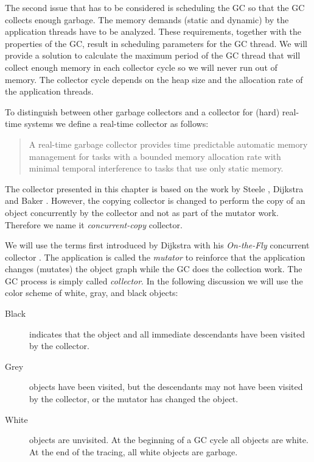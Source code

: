The second issue that has to be considered is scheduling the GC so
that the GC collects enough garbage. The memory demands (static and
dynamic) by the application threads have to be analyzed. These
requirements, together with the properties of the GC, result in
scheduling parameters for the GC thread. We will provide a solution
to calculate the maximum period of the GC thread that will collect
enough memory in each collector cycle so we will never run out of
memory. The collector cycle depends on the heap size and the
allocation rate of the application threads.

To distinguish between other garbage collectors and a collector for
(hard) real-time systems we define a real-time collector as follows:

\begin{quote}
    A real-time garbage collector provides time predictable
    automatic memory management for tasks with a bounded memory
    allocation rate with minimal temporal interference to tasks
    that use only static memory.
\end{quote}


The collector presented in this chapter is based on the work by
Steele \cite{gc:steele75},  Dijkstra \cite{gc:dijkstra78} and Baker
\cite{gc:baker78}. However, the copying collector is changed to
perform the copy of an object concurrently by the collector and not
as part of the mutator work. Therefore we name it
\emph{concurrent-copy} collector.

We will use the terms first introduced by Dijkstra with his
\emph{On-the-Fly} concurrent collector \cite{gc:dijkstra78}. The
application is called the \emph{mutator} to reinforce that the
application changes (mutates) the object graph while the GC does the
collection work. The GC process is simply called \emph{collector}. In
the following discussion we will use the color scheme of white, gray,
and black objects:

\begin{description}
    \item[Black] indicates that the object and all immediate
    descendants have been visited by the collector.
    \item[Grey] objects have been visited, but the descendants may
    not have been visited by the collector, or the mutator has
    changed the object.
    \item[White] objects are unvisited. At the beginning of a GC
        cycle all objects are white. At the end of the tracing,
        all white objects are garbage.
\end{description}

